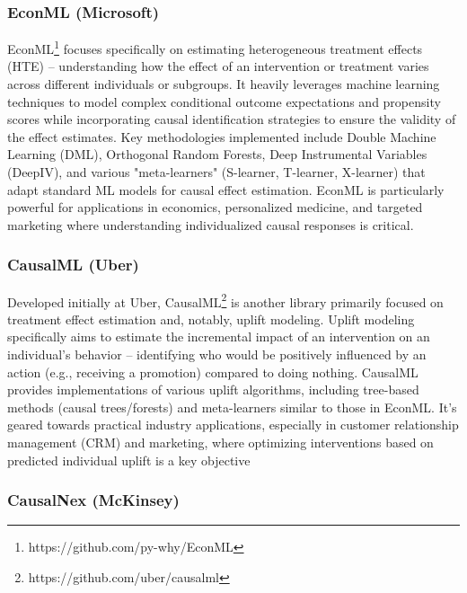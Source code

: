 \subsubsection{EconML (Microsoft)}

EconML\footnote{https://github.com/py-why/EconML} \cite{oprescu2019econml} focuses specifically on estimating heterogeneous treatment effects (HTE) – understanding how the effect of an intervention or treatment varies across different individuals or subgroups. It heavily leverages machine learning techniques to model complex conditional outcome expectations and propensity scores while incorporating causal identification strategies to ensure the validity of the effect estimates. Key methodologies implemented include Double Machine Learning (DML), Orthogonal Random Forests, Deep Instrumental Variables (DeepIV), and various "meta-learners" (S-learner, T-learner, X-learner) that adapt standard ML models for causal effect estimation. EconML is particularly powerful for applications in economics, personalized medicine, and targeted marketing where understanding individualized causal responses is critical.

\subsubsection{CausalML (Uber)}


Developed initially at Uber, CausalML\footnote{https://github.com/uber/causalml} \cite{zhao2023causal} is another library primarily focused on treatment effect estimation and, notably, uplift modeling. Uplift modeling specifically aims to estimate the incremental impact of an intervention on an individual's behavior – identifying who would be positively influenced by an action (e.g., receiving a promotion) compared to doing nothing. CausalML provides implementations of various uplift algorithms, including tree-based methods (causal trees/forests) and meta-learners similar to those in EconML. It's geared towards practical industry applications, especially in customer relationship management (CRM) and marketing, where optimizing interventions based on predicted individual uplift is a key objective

\subsubsection{CausalNex (McKinsey)}

